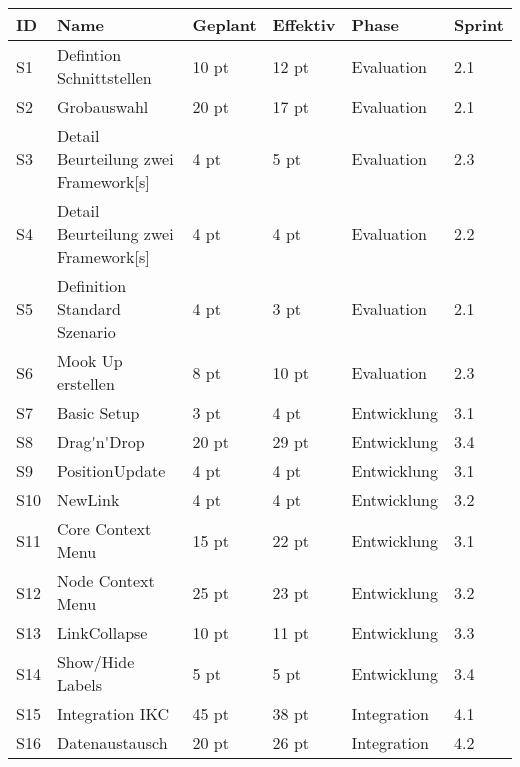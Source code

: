 \begin{longtable}{|p{0.6cm}|P{3.5cm}|p{1.4cm}|p{1.4cm}|p{2.4cm}|p{1.1cm}|}
\hline
ID  & Name & Geplant & Effektiv & Phase & Sprint\\ \hline
S1 & Defintion Schnittstellen           & 10 pt             & 12 pt               & Evaluation  & 2.1 \\ \hline
S2 & Grobauswahl                        & 20 pt             & 17 pt               & Evaluation  & 2.1 \\ \hline
S3 & Detail Beurteilung zwei \gls{Framework}[s] & 4 pt               & 5 pt                & Evaluation  & 2.3 \\ \hline
S4 & Detail Beurteilung zwei \gls{Framework}[s] & 4 pt               & 4 pt                & Evaluation  & 2.2 \\ \hline
S5 & Definition Standard Szenario       & 4 pt               & 3 pt                & Evaluation  & 2.1 \\ \hline
S6 & Mook Up erstellen                  & 8 pt               & 10 pt               & Evaluation  & 2.3 \\ \hline
S7 & Basic Setup                        & 3 pt               & 4 pt                & Entwicklung & 3.1 \\ \hline
S8 & \gls{Drag'n'Drop}                        & 20 pt              & 29 pt               & Entwicklung & 3.4 \\ \hline
S9 & PositionUpdate                     & 4 pt               & 4 pt                & Entwicklung & 3.1 \\ \hline
S10 & NewLink                            & 4 pt               & 4 pt                & Entwicklung & 3.2 \\ \hline
S11 & Core Context Menu                    & 15 pt              & 22 pt               & Entwicklung & 3.1 \\ \hline
S12 & Node Context Menu                    & 25 pt              & 23 pt               & Entwicklung & 3.2 \\ \hline
S13 & LinkCollapse                       & 10 pt              & 11 pt                & Entwicklung & 3.3 \\ \hline
S14 & Show/Hide Labels                   & 5 pt               & 5 pt                & Entwicklung & 3.4 \\ \hline
S15 & Integration IKC                    & 45 pt              & 38 pt               & Integration & 4.1 \\ \hline
S16 & Datenaustausch                     & 20 pt              & 26 pt               & Integration & 4.2 \\ \hline

\end{longtable}
